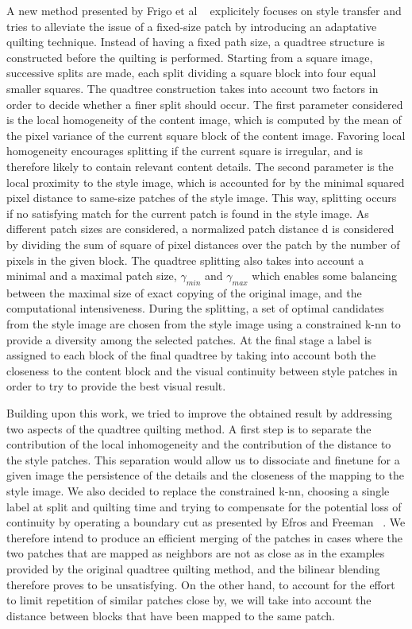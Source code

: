 \documentclass[a4paper]{article}
\begin{document}
A new method presented by Frigo et al ~\cite{adaptative-quilting} explicitely focuses on style transfer and tries to alleviate the issue of a fixed-size patch by introducing an adaptative quilting technique. Instead of having a fixed path size, a quadtree structure is constructed before the quilting is performed. Starting from a square image, successive splits are made, each split dividing a square block into four equal smaller squares. The quadtree construction takes into account two factors in order to decide whether a finer split should occur. The first parameter considered is the local homogeneity of the content image, which is computed by the mean of the pixel variance of the current square block of the content image. Favoring local homogeneity encourages splitting if the current square is irregular, and is therefore likely to contain relevant content details.  The second parameter is the local proximity to the style image, which is accounted for by the minimal squared pixel distance to same-size patches of the style image. This way, splitting occurs if no satisfying match for the current patch is found in the style image. As different patch sizes are considered, a normalized patch distance d is considered by dividing the sum of square of pixel distances over the patch by the number of pixels in the given block. The quadtree splitting also takes into account a minimal and a maximal patch size, ${\gamma_{min}}$ and ${\gamma_{max}}$ which enables some balancing between the maximal size of exact copying of the original image, and the computational intensiveness. During the splitting, a set of optimal candidates from the style image are chosen from the style image using a constrained k-nn to provide a diversity among the selected patches. At the final stage a label is assigned to each block of the final quadtree by taking into account both the closeness to the content block and the visual continuity between style patches in order to try to provide the best visual result. 

Building upon this work, we tried to improve the obtained result by addressing two aspects of the quadtree quilting method. A first step is to separate the contribution of the local inhomogeneity and the contribution of the distance to the style patches. This separation would allow us to dissociate and finetune for a given image the persistence of the details and the closeness of the mapping to the style image. We also decided to replace the constrained k-nn, choosing a single label at split and quilting time and trying to compensate for the potential loss of continuity by operating a boundary cut as presented by Efros and Freeman ~\cite{quilting}. We therefore intend to produce an efficient merging of the patches in cases where the two patches that are mapped as neighbors are not as close as in the examples provided by the original quadtree quilting method, and the bilinear blending therefore proves to be unsatisfying. On the other hand, to account for the effort to limit repetition of similar patches close by, we will take into account the distance between blocks that have been mapped to the same patch.  
\end{document}
